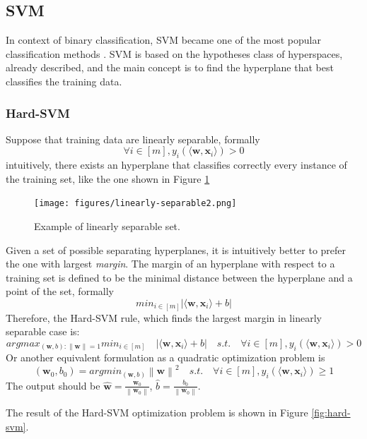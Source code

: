 \subsection{SVM}

In context of binary classification, \acl{SVM} became one of the most popular classification methods \cite{article-svm}. \ac{SVM} is based on the hypotheses class of hyperspaces, already described, and the main concept is to find the hyperplane that best classifies the training data.

\subsubsection{Hard-SVM}

Suppose that training data are linearly separable, formally
\[ \forall i \in [m], y_i (\langle \mathbf{w}, \mathbf{x}_i \rangle) > 0 \]
intuitively, there exists an hyperplane that classifies correctly every instance of the training set, like the one shown in Figure \ref{fig:linearly-separable}

\begin{figure}[ht]
	\centering
	\texttt{[image: figures/linearly-separable2.png]}
	\caption{Example of linearly separable set.}
	\label{fig:linearly-separable}
\end{figure}

Given a set of possible separating hyperplanes, it is intuitively better to prefer the one with largest \textit{margin}. The margin of an hyperplane with respect to a training set is defined to be the minimal distance between the hyperplane and a point of the set, formally
\[ min_{i \in [m]} | \langle \mathbf{w}, \mathbf{x}_i \rangle + b | \]
Therefore, the Hard-\ac{SVM} rule, which finds the largest margin in linearly separable case is:
\[ argmax_{(\mathbf{w}, b) : \left\lVert \mathbf{w} \right\rVert = 1} min_{i \in [m]} \quad | \langle \mathbf{w}, \mathbf{x}_i \rangle + b | \quad s.t. \quad \forall i \in [m], y_i (\langle \mathbf{w}, \mathbf{x}_i \rangle) > 0 \]
Or another equivalent formulation as a quadratic optimization problem is
\[ (\mathbf{w}_0, b_0) = argmin_{(\mathbf{w}, b)} \left\lVert \mathbf{w} \right\rVert ^2 \quad s.t. \quad \forall i \in [m], y_i (\langle \mathbf{w}, \mathbf{x}_i \rangle) \ge 1 \]
The output should be $\hat{\mathbf{w}} = \frac{\mathbf{w}_0}{\left\lVert \mathbf{w}_0 \right\rVert}$, $\hat{b} = \frac{b_0}{\left\lVert \mathbf{w}_0 \right\rVert}$.

The result of the Hard-\ac{SVM} optimization problem is shown in Figure \ref{fig:hard-svm}.

